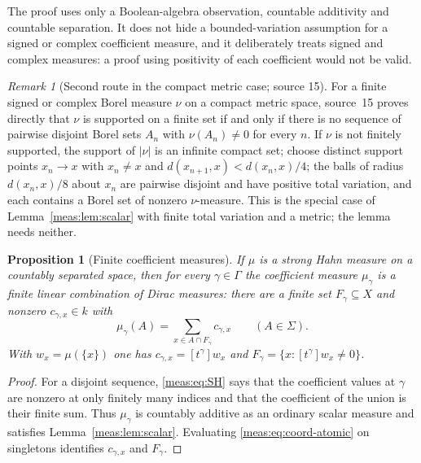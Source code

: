 \documentclass[11pt]{article}
\numberwithin{equation}{section}
\newtheorem{proposition}[theorem]{Proposition}
\theoremstyle{definition}
\theoremstyle{remark}
\newtheorem{remark}[theorem]{Remark}
\newcommand{\coef}[2]{[t^{#1}]#2}
\newcommand{\abs}[1]{\lvert#1\rvert}
\begin{document}
The proof uses only a Boolean-algebra observation, countable additivity and
countable separation. It does not hide a bounded-variation assumption for a
signed or complex coefficient measure, and it deliberately treats signed and
complex measures: a proof using positivity of each coefficient would not be
valid.

\begin{remark}[Second route in the compact metric case; source 15]
\label{meas:rem:disjoint}
For a finite signed or complex Borel measure $\nu$ on a compact metric space,
source~15 proves directly that $\nu$ is supported on a finite set if and only
if there is no sequence of pairwise disjoint Borel sets $A_n$ with
$\nu(A_n)\ne0$ for every $n$. If $\nu$ is not finitely supported, the support
of $\abs\nu$ is an infinite compact set; choose distinct support points
$x_n\to x$ with $x_n\ne x$ and $d(x_{n+1},x)<d(x_n,x)/4$; the balls of radius
$d(x_n,x)/8$ about $x_n$ are pairwise disjoint and have positive total
variation, and each contains a Borel set of nonzero $\nu$-measure. This is
the special case of Lemma~\ref{meas:lem:scalar} with finite total variation
and a metric; the lemma needs neither.
\end{remark}

\begin{proposition}[Finite coefficient measures]\label{meas:prop:coefficients}
If $\mu$ is a strong Hahn measure on a countably separated space, then for
every $\gamma\in\Gamma$ the coefficient measure $\mu_\gamma$ is a finite linear
combination of Dirac measures: there are a finite set $F_\gamma\subseteq X$ and
nonzero $c_{\gamma,x}\in k$ with
\begin{equation}\label{meas:eq:coord-atomic}
 \mu_\gamma(A)=\sum_{x\in A\cap F_\gamma}c_{\gamma,x}\qquad(A\in\Sigma).
\end{equation}
With $w_x=\mu(\{x\})$ one has $c_{\gamma,x}=\coef{\gamma}{w_x}$ and
$F_\gamma=\{x:\coef{\gamma}{w_x}\ne0\}$.
\end{proposition}
\begin{proof}
For a disjoint sequence, \eqref{meas:eq:SH} says that the coefficient values at
$\gamma$ are nonzero at only finitely many indices and that the coefficient of
the union is their finite sum. Thus $\mu_\gamma$ is countably additive as an
ordinary scalar measure and satisfies Lemma~\ref{meas:lem:scalar}. Evaluating
\eqref{meas:eq:coord-atomic} on singletons identifies $c_{\gamma,x}$ and
$F_\gamma$.
\end{proof}
\end{document}
